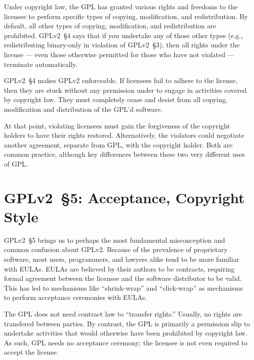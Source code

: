 Under copyright law, the GPL has granted various rights and freedoms to
the licensee to perform specific types of copying, modification, and
redistribution.  By default, all other types of copying, modification, and
redistribution are prohibited.  GPLv2~\S4 says that if you undertake any of
those other types (e.g., redistributing binary-only in violation of GPLv2~\S3),
then all rights under the license --- even those otherwise permitted for
those who have not violated --- terminate automatically.

GPLv2~\S4 makes GPLv2 enforceable.  If licensees fail to adhere to the
license, then they are stuck without any permission under to engage in
activities covered by copyright law.  They must completely cease and desist
from all copying, modification and distribution of the GPL'd software.

At that point, violating licensees must gain the forgiveness of the copyright
holders to have their rights restored.  Alternatively, the violators could
negotiate another agreement, separate from GPL, with the copyright
holder.  Both are common practice, although
 key differences between these two very different uses of GPL.

\section{GPLv2~\S5: Acceptance, Copyright Style}
\label{GPLv2s5}

GPLv2~\S5 brings us to perhaps the most fundamental misconception and common
confusion about GPLv2\@. Because of the prevalence of proprietary software,
most users, programmers, and lawyers alike tend to be more familiar with
EULAs. EULAs are believed by their authors to be contracts, requiring
formal agreement between the licensee and the software distributor to be
valid. This has led to mechanisms like ``shrink-wrap'' and ``click-wrap''
as mechanisms to perform acceptance ceremonies with EULAs.

The GPL does not need contract law to ``transfer rights.''  Usually, no rights
are transfered between parties.  By contrast, the GPL is primarily a permission
slip to undertake activities that would otherwise have been prohibited
by copyright law.  As such, GPL needs no acceptance ceremony; the
licensee is not even required to accept the license.

